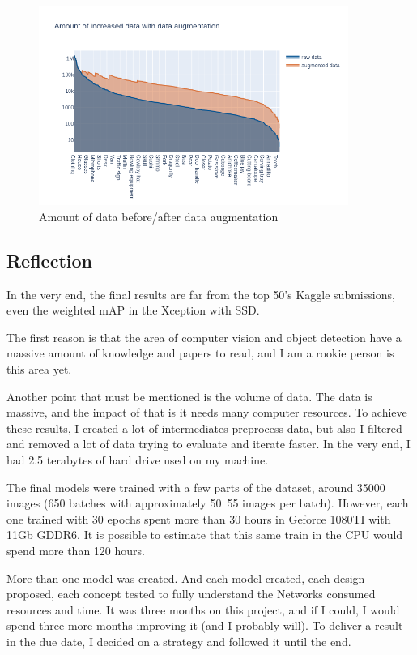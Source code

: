 \documentclass[11pt, a4paper, twocolumn]{article}
\begin{document}
\begin{figure}[ht]
	\centering
	\includegraphics[width=0.9\textwidth]{data-aug1.png}
	\caption{Amount of data before/after data augmentation}
	\label{augincreased}
\end{figure}

\subsection{Reflection}

In the very end, the final results are far from the top 50's Kaggle submissions, even the weighted mAP in the Xception with SSD.

The first reason is that the area of computer vision and object detection have a massive amount of knowledge and papers to read, and I am a rookie person is this area yet.

Another point that must be mentioned is the volume of data. The data is massive, and the impact of that is it needs many computer resources. To achieve these results, I created a lot of intermediates preprocess data, but also I filtered and removed a lot of data trying to evaluate and iterate faster. In the very end, I had 2.5 terabytes of hard drive used on my machine.

The final models were trained with a few parts of the dataset, around 35000 images (650 batches with approximately 50~55 images per batch). However, each one trained with 30 epochs spent more than 30 hours in Geforce 1080TI with 11Gb GDDR6. It is possible to estimate that this same train in the CPU would spend more than 120 hours.

More than one model was created. And each model created, each design proposed, each concept tested to fully understand the Networks consumed resources and time. It was three months on this project, and if I could, I would spend three more months improving it (and I probably will). To deliver a result in the due date, I decided on a strategy and followed it until the end.
\end{document}
